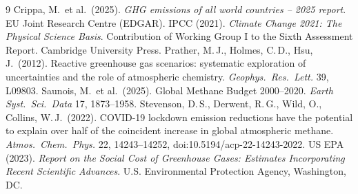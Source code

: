 \documentclass[11pt,a4paper]{article}
\begin{document}
\small
\begin{thebibliography}{9}\itemsep0pt
 Crippa, M.\ et al.\ (2025). \emph{GHG emissions of all world countries -- 2025 report}. EU Joint Research Centre (EDGAR).
 IPCC (2021). \emph{Climate Change 2021: The Physical Science Basis}. Contribution of Working Group I to the Sixth Assessment Report. Cambridge University Press.
 Prather, M.\,J., Holmes, C.\,D., Hsu, J.\ (2012). Reactive greenhouse gas scenarios: systematic exploration of uncertainties and the role of atmospheric chemistry. \emph{Geophys.\ Res.\ Lett.} 39, L09803.
 Saunois, M.\ et al.\ (2025). Global Methane Budget 2000--2020. \emph{Earth Syst.\ Sci.\ Data} 17, 1873--1958.
 Stevenson, D.\,S., Derwent, R.\,G., Wild, O., Collins, W.\,J.\ (2022). COVID-19 lockdown emission reductions have the potential to explain over half of the coincident increase in global atmospheric methane. \emph{Atmos.\ Chem.\ Phys.} 22, 14243--14252, doi:10.5194/acp-22-14243-2022.
 US EPA (2023). \emph{Report on the Social Cost of Greenhouse Gases: Estimates Incorporating Recent Scientific Advances}. U.S. Environmental Protection Agency, Washington, DC.
\end{thebibliography}
\end{document}
